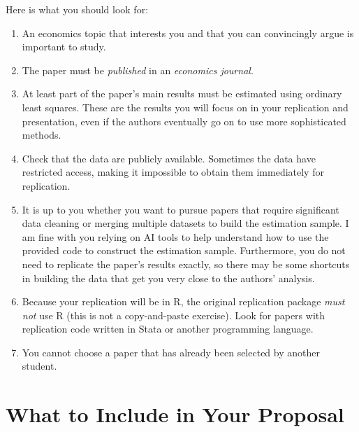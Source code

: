 \documentclass[11pt]{article}
\begin{document}
Here is what you should look for:
\begin{enumerate}
\item An economics topic that interests you and that you can convincingly argue is important to study.
\item The paper must be \emph{published} in an \emph{economics journal}.
\item At least part of the paper's main results must be estimated using ordinary least squares. These are the results you will focus on in your replication and presentation, even if the authors eventually go on to use more sophisticated methods.
\item Check that the data are publicly available. Sometimes the data have restricted access, making it impossible to obtain them immediately for replication.
\item It is up to you whether you want to pursue papers that require significant data cleaning or merging multiple datasets to build the estimation sample. I am fine with you relying on AI tools to help understand how to use the provided code to construct the estimation sample. Furthermore, you do not need to replicate the paper's results exactly, so there may be some shortcuts in building the data that get you very close to the authors' analysis.
\item Because your replication will be in R, the original replication package \emph{must not} use R (this is not a copy-and-paste exercise). Look for papers with replication code written in Stata or another programming language.
\item You cannot choose a paper that has already been selected by another student.
\end{enumerate}

\newpage
\section*{What to Include in Your Proposal}
\end{document}
